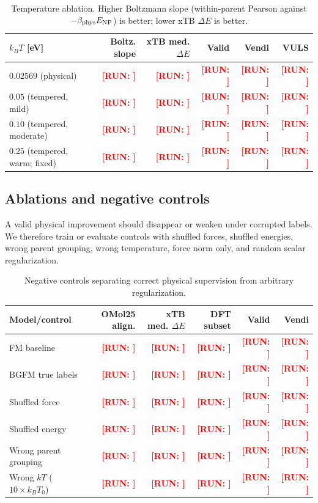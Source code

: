 \documentclass{article}
\newcommand{\Run}[1]{\textcolor{red}{\textbf{[RUN: #1]}}}
\begin{document}
\begin{table}[h]
\centering
\caption{Temperature ablation. Higher Boltzmann slope (within-parent
Pearson against $-\beta_{\rm phys} E_{\rm NP}$) is better; lower xTB
$\Delta E$ is better.}
\begin{tabular}{lrrrrr}
\toprule
$k_B T$ [eV] & Boltz. slope & xTB med. $\Delta E$ & Valid & Vendi & VULS \\
\midrule
$0.02569$ (physical)             & \Run{} & \Run{} & \Run{} & \Run{} & \Run{} \\
$0.05$ (tempered, mild)          & \Run{} & \Run{} & \Run{} & \Run{} & \Run{} \\
$0.10$ (tempered, moderate)      & \Run{} & \Run{} & \Run{} & \Run{} & \Run{} \\
$0.25$ (tempered, warm; fixed)   & \Run{} & \Run{} & \Run{} & \Run{} & \Run{} \\
\bottomrule
\end{tabular}
\end{table}

\subsection{Ablations and negative controls}
\label{sec:exp:ablation}

A valid physical improvement should disappear or weaken under corrupted
labels. We therefore train or evaluate controls with shuffled forces,
shuffled energies, wrong parent grouping, wrong temperature, force norm
only, and random scalar regularization.

\begin{table}[h]
\centering
\caption{Negative controls separating correct physical supervision from arbitrary regularization.}
\begin{tabular}{lrrrrr}
\toprule
Model/control & OMol25 align. & xTB med. $\Delta E$ & DFT subset & Valid & Vendi \\
\midrule
FM baseline & \Run{} & \Run{} & \Run{} & \Run{} & \Run{} \\
BGFM true labels & \Run{} & \Run{} & \Run{} & \Run{} & \Run{} \\
Shuffled force & \Run{} & \Run{} & \Run{} & \Run{} & \Run{} \\
Shuffled energy & \Run{} & \Run{} & \Run{} & \Run{} & \Run{} \\
Wrong parent grouping & \Run{} & \Run{} & \Run{} & \Run{} & \Run{} \\
Wrong $kT$ ($10\times k_B T_0$) & \Run{} & \Run{} & \Run{} & \Run{} & \Run{} \\
\bottomrule
\end{tabular}
\end{table}
\end{document}
